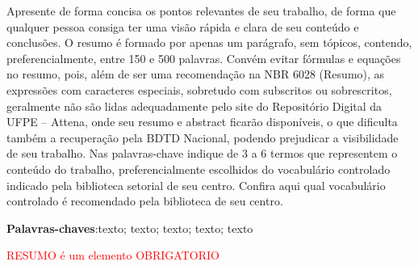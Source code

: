 
\begin{resumo}[Resumo]

Apresente de forma concisa os pontos relevantes de seu trabalho, de forma que qualquer pessoa consiga ter uma visão rápida e clara de seu conteúdo e conclusões. O resumo é formado por apenas um parágrafo, sem tópicos, contendo, preferencialmente, entre 150 e 500 palavras. Convém evitar fórmulas e equações no resumo, pois, além de ser uma recomendação na NBR 6028 (Resumo), as expressões com caracteres especiais, sobretudo com subscritos ou sobrescritos, geralmente não são lidas adequadamente pelo site do Repositório Digital da UFPE – Attena, onde seu resumo e abstract ficarão disponíveis, o que dificulta também a recuperação pela BDTD Nacional, podendo prejudicar a visibilidade de seu trabalho. Nas palavras-chave indique de 3 a 6 termos que representem o conteúdo do trabalho, preferencialmente escolhidos do vocabulário controlado indicado pela biblioteca setorial de seu centro. Confira aqui qual vocabulário controlado é recomendado pela biblioteca de seu centro.


 \vspace{\onelineskip}
    
 \noindent
 \textbf{Palavras-chaves}:texto; texto; texto; texto; texto

 \textcolor{red}{RESUMO é um elemento OBRIGATORIO}

 
\end{resumo}



